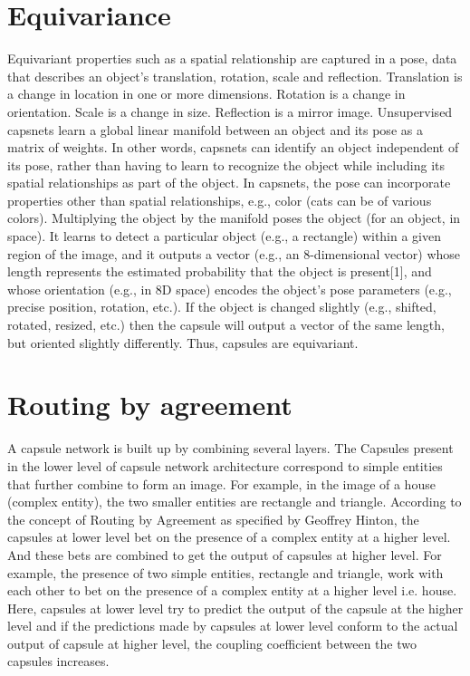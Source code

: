 \documentclass[a4paper,12pt]{report}
\begin{document}
\section{Equivariance}
Equivariant properties such as a spatial relationship are captured in a pose, data that describes an object's translation, rotation, scale and reflection. Translation is a change in location in one or more dimensions. Rotation is a change in orientation. Scale is a change in size. Reflection is a mirror image.
Unsupervised capsnets learn a global linear manifold between an object and its pose as a matrix of weights. In other words, capsnets can identify an object independent of its pose, rather than having to learn to recognize the object while including its spatial relationships as part of the object. In capsnets, the pose can incorporate properties other than spatial relationships, e.g., color (cats can be of various colors).
Multiplying the object by the manifold poses the object (for an object, in space). 
It learns to detect a particular object (e.g., a rectangle) within a given region of the image, and it outputs a vector (e.g., an 8-dimensional vector) whose length represents the estimated probability that the object is present[1], and whose orientation (e.g., in 8D space) encodes the object's pose parameters (e.g., precise position, rotation, etc.). If the object is changed slightly (e.g., shifted, rotated, resized, etc.) then the capsule will output a vector of the same length, but oriented slightly differently. Thus, capsules are equivariant.

\section{Routing by agreement}
A capsule network is built up by combining several layers. The Capsules present in the lower level of capsule network architecture correspond to simple entities that further combine to form an image. For example, in the image of a house (complex entity), the two smaller entities are rectangle and triangle. According to the concept of Routing by Agreement as specified by Geoffrey Hinton, the capsules at lower level bet on the presence of a complex entity at a higher level. And these bets are combined to get the output of capsules at higher level. For example, the presence of two simple entities, rectangle and triangle, work with each other to bet on the presence of a complex entity at a higher level i.e. house. Here, capsules at lower level try to predict the output of the capsule at the higher level and if the predictions made by capsules at lower level conform to the actual output of capsule at higher level, the coupling coefficient between the two capsules increases.
\end{document}
